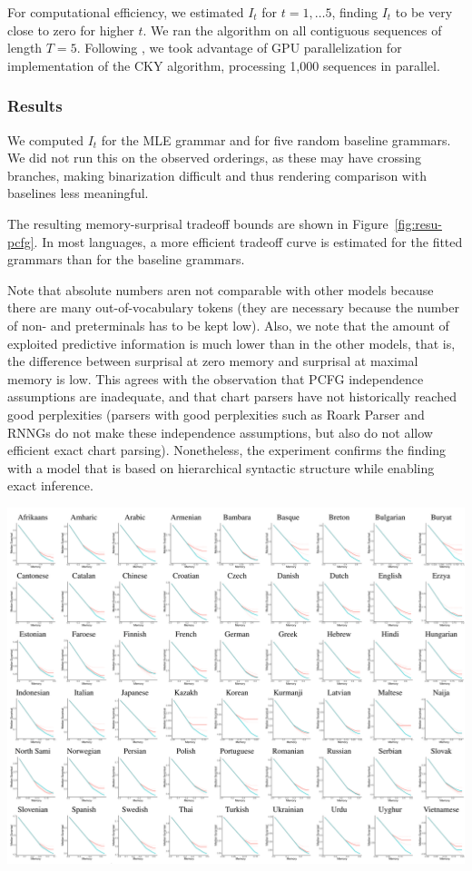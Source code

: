 \documentclass[11pt,letterpaper]{article}
\begin{document}
For computational efficiency, we estimated $I_t$ for $t=1, \dots 5$, finding $I_t$ to be very close to zero for higher $t$.
We ran the algorithm on all contiguous sequences of length $T=5$.
Following \cite{DBLP:conf/acl/KimDR19}, we took advantage of GPU parallelization for implementation of the CKY algorithm, processing 1,000 sequences in parallel.


\subsubsection{Results}
We computed $I_t$ for the MLE grammar and for five random baseline grammars.
We did not run this on the observed orderings, as these may have crossing branches, making binarization difficult and thus rendering comparison with baselines less meaningful.

The resulting memory-surprisal tradeoff bounds are shown in Figure~\ref{fig:resu-pcfg}.
In most languages, a more efficient tradeoff curve is estimated for the fitted grammars than for the baseline grammars.

Note that absolute numbers aren not comparable with other models because there are many out-of-vocabulary tokens (they are necessary because the number of non- and preterminals has to be kept low).
Also, we note that the amount of exploited predictive information is much lower than in the other models, that is, the difference between surprisal at zero memory and surprisal at maximal memory is low.
This agrees with the observation that PCFG independence assumptions are inadequate, and that chart parsers have not historically reached good perplexities (parsers with good perplexities such as Roark Parser and RNNGs do not make these independence assumptions, but also do not allow efficient exact chart parsing).
Nonetheless, the experiment confirms the finding with a model that is based on hierarchical syntactic structure while enabling exact inference.

\begin{center}
\includegraphics[width=\textwidth]{results-table-pcfg.pdf}
\label{fig:resu-pcfg}
\end{center}
\end{document}
